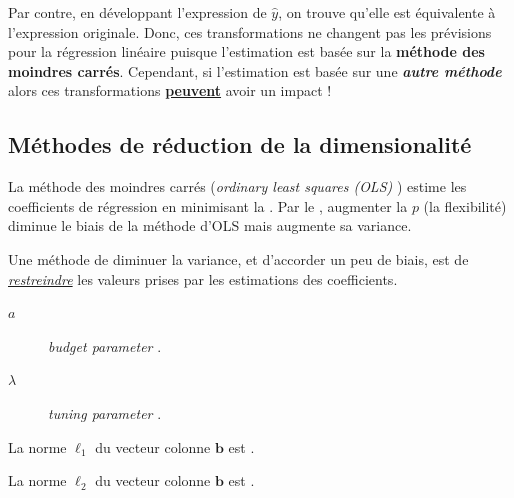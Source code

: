 \documentclass[french]{article}
\begin{document}
\begin{multicols*}{2}
\begin{rappel_enhanced}[Contexte]
\bigskip

Par contre, en développant l'expression de $\hat{y}$, on trouve qu'elle est équivalente à l'expression originale. Donc, ces transformations ne changent pas les prévisions pour la régression linéaire puisque l'estimation est basée sur la \textbf{méthode des moindres carrés}. Cependant, si l'estimation est basée sur une \textit{\textbf{autre méthode}} alors ces transformations \textbf{\underline{peuvent}} avoir un impact ! 
\end{rappel_enhanced}



\columnbreak
\subsection{Méthodes de réduction de la dimensionalité}
\begin{rappel_enhanced}[Contexte]
La méthode des moindres carrés (\og \textit{ordinary least squares (OLS)} \fg{}) estime les coefficients de régression en minimisant la . Par le \textit{\underline{}}, augmenter la $p$ (la flexibilité) diminue le biais de la méthode d'OLS mais augmente sa variance.

\bigskip

Une méthode de diminuer la variance, et d'accorder un peu de biais, est de \underline{\textit{restreindre}} les valeurs prises par les estimations des coefficients. 
\end{rappel_enhanced}

\begin{distributions}[Notation]
\begin{description}
	\item[$a$]	\og \textit{budget parameter} \fg{}.
	\item[$\lambda$]	\og \textit{tuning parameter} \fg{}.
\end{description}
\end{distributions}

\begin{definitionNOHFILL}
La norme $\ell_{1}$ du vecteur colonne $\bm{b}$ est .
\end{definitionNOHFILL}

\begin{definitionNOHFILL}
La norme $\ell_{2}$ du vecteur colonne $\bm{b}$ est .
\end{definitionNOHFILL}



\end{multicols*}
\end{document}
